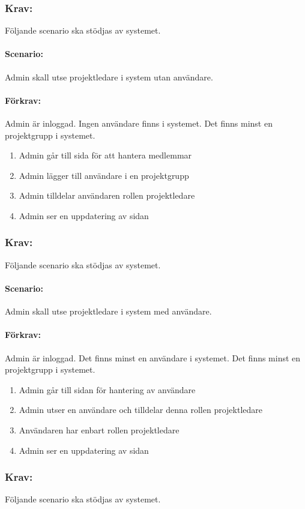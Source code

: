 \documentclass[paper=a4, fontsize=11pt,twoside]{article}
\begin{document}
\subsubsection{Krav:} Följande scenario ska stödjas av systemet. 
\paragraph{Scenario:}
Admin skall utse projektledare i system utan användare.
\paragraph{Förkrav:}
Admin är inloggad. Ingen användare finns i systemet. Det finns minst en projektgrupp i systemet.
\begin{enumerate}
\item Admin går till sida för att hantera medlemmar
\item Admin lägger till användare i en projektgrupp
\item Admin tilldelar användaren rollen projektledare
\item Admin ser en uppdatering av sidan
\end{enumerate}

\subsubsection{Krav:} Följande scenario ska stödjas av systemet. 
\paragraph{Scenario:}
Admin skall utse projektledare i system med användare.
\paragraph{Förkrav:}
Admin är inloggad. Det finns minst en användare i systemet. Det finns minst en projektgrupp i systemet.
\begin{enumerate}
\item Admin går till sidan för hantering av användare
\item Admin utser en användare och tilldelar denna rollen projektledare
\item Användaren har enbart rollen projektledare
\item Admin ser en uppdatering av sidan
\end{enumerate}

\subsubsection{Krav:} Följande scenario ska stödjas av systemet. 
\end{document}
